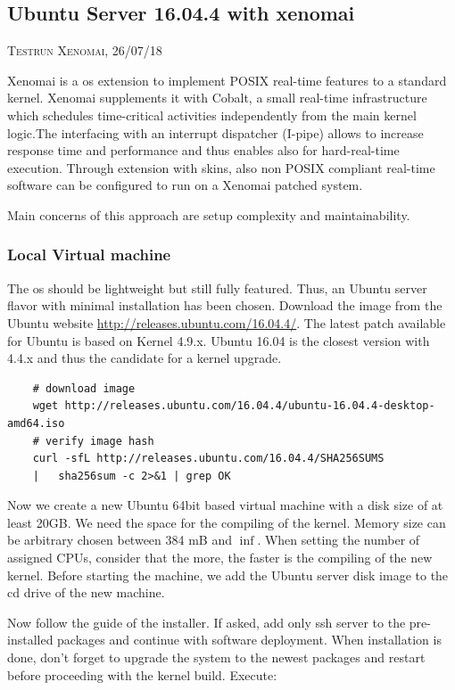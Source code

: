 \documentclass[]{scrartcl}
\begin{document}
\subsection{Ubuntu Server 16.04.4 with xenomai}

{\small\textsc{Testrun Xenomai, 26/07/18} \bigskip}

Xenomai is a os extension to implement POSIX real-time features to a standard kernel. Xenomai supplements it with Cobalt, a small real-time infrastructure which schedules time-critical activities independently from the main kernel logic.The interfacing with an interrupt dispatcher (I-pipe) allows to increase response time and performance and thus enables also for hard-real-time execution. Through extension with skins, also non POSIX compliant real-time software can be configured to run on a Xenomai patched system.

Main concerns of this approach are setup complexity and maintainability.

\subsubsection{Local Virtual machine}
\label{sec:xenoinst}
The os should be lightweight but still fully featured. Thus, an Ubuntu server flavor with minimal installation has been chosen. Download the image from the Ubuntu website \url{http://releases.ubuntu.com/16.04.4/}. The latest patch available for Ubuntu is based on Kernel 4.9.x. Ubuntu 16.04 is the closest version with 4.4.x and thus the candidate for a kernel upgrade.

\begin{verbatim}
	# download image
	wget http://releases.ubuntu.com/16.04.4/ubuntu-16.04.4-desktop-amd64.iso
	# verify image hash
	curl -sfL http://releases.ubuntu.com/16.04.4/SHA256SUMS
	|	sha256sum -c 2>&1 | grep OK
\end{verbatim}

Now we create a new Ubuntu 64bit based virtual machine with a disk size of at least 20GB. We need the space for the compiling of the kernel. Memory size can be arbitrary chosen between 384 mB and $\inf$. When setting the number of assigned CPUs, consider that the more, the faster is the compiling of the new kernel.
Before starting the machine, we add the Ubuntu server disk image to the cd drive of the new machine.

Now follow the guide of the installer. If asked, add only ssh server to the pre-installed packages and continue with software deployment. When installation is done, don't forget to upgrade the system to the newest packages and restart before proceeding with the kernel build. Execute:
\end{document}
